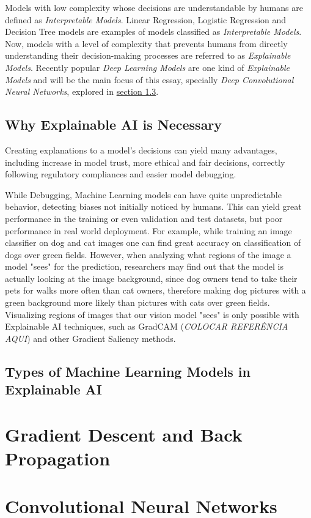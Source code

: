 Models with low complexity whose decisions are understandable by humans are defined as \emph{Interpretable Models}. Linear Regression, Logistic Regression and Decision Tree models are examples of models classified as \emph{Interpretable Models}. 
Now, models with a level of complexity that prevents humans from directly understanding their decision-making processes are referred to as \emph{Explainable Models}. 
Recently popular \emph{Deep Learning Models} are one kind of \emph{Explainable Models} and will be the main focus of this essay, specially \emph{Deep Convolutional Neural Networks}, explored in \hyperref[sec:convolutions]{section 1.3}.

\subsection{Why Explainable AI is Necessary}

Creating explanations to a model's decisions can yield many advantages, including increase in model trust, more ethical and fair decisions, correctly following regulatory compliances and easier model debugging.

While Debugging, Machine Learning models can have quite unpredictable behavior, detecting biases not initially noticed by humans. This can yield great performance in the training or even validation and test datasets,
but poor performance in real world deployment. For example, while training an image classifier on dog and cat images one can find great accuracy on classification of dogs over green fields. However, 
when analyzing what regions of the image a model "sees" for the prediction, researchers may find out that the model is actually looking at the image background, 
since dog owners tend to take their pets for walks more often than cat owners, therefore making dog pictures with a green background more likely than pictures with cats over green fields. 
Visualizing regions of images that our vision model "sees" is only possible with Explainable AI techniques, such as GradCAM (\emph{COLOCAR REFERÊNCIA AQUI}) and other Gradient Saliency methods.

\subsection{Types of Machine Learning Models in Explainable AI}

\citet{DBLP:journals/corr/Miller17a}

\section{Gradient Descent and Back Propagation}

\lipsum[4]

\section{Convolutional Neural Networks}
\label{sec:convolutions}

\lipsum[5-6]




